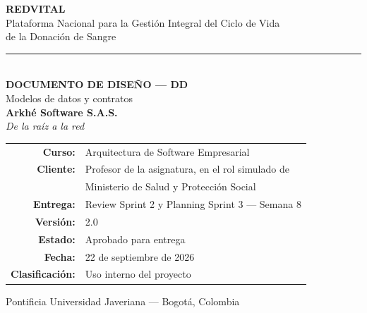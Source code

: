 \documentclass[11pt,a4paper]{article}
\begin{document}

\begin{titlepage}
\centering
\vspace*{2.0cm}

{\Huge\bfseries\color{vinotinto} REDVITAL}\\[0.5cm]
{\large\color{vinotinto} Plataforma Nacional para la Gestión Integral del Ciclo de Vida\\ de la Donación de Sangre}\\[1.6cm]

{\color{vinotinto}\rule{0.45\textwidth}{1.2pt}}\\[1.6cm]

{\LARGE\bfseries DOCUMENTO DE DISEÑO --- DD}\\[0.4cm]
{\Large Modelos de datos y contratos}\\[1.8cm]

{\large\bfseries Arkhé Software S.A.S.}\\[0.3cm]
{\itshape De la raíz a la red}\\[1.8cm]

\begin{tabular}{r l}
\textbf{Curso:} & Arquitectura de Software Empresarial \\
\textbf{Cliente:} & Profesor de la asignatura, en el rol simulado de \\
 & Ministerio de Salud y Protección Social \\
\textbf{Entrega:} & Review Sprint 2 y Planning Sprint 3 --- Semana 8 \\
\textbf{Versión:} & 2.0 \\
\textbf{Estado:} & Aprobado para entrega \\
\textbf{Fecha:} & 22 de septiembre de 2026 \\
\textbf{Clasificación:} & Uso interno del proyecto \\
\end{tabular}

\vfill
{\small\color{grisTexto} Pontificia Universidad Javeriana --- Bogotá, Colombia}
\end{titlepage}

\end{document}
